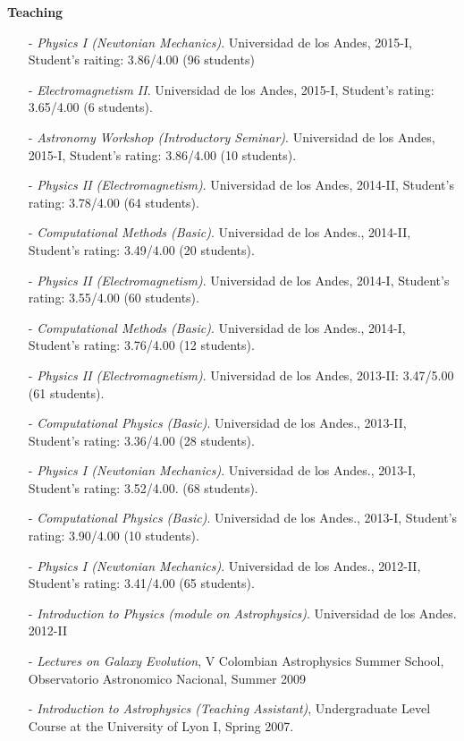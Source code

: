 \documentclass[letterpaper,11pt,onecolumn]{article}
\begin{document}
{\bf Teaching}
\begin{itemize}

\item[-] {\it Physics I (Newtonian Mechanics)}. Universidad de los
  Andes, 2015-I,  Student's raiting: 3.86/4.00 (96 students)
\item[-] {\it Electromagnetism II}. Universidad de los Andes, 2015-I,
  Student's rating: 3.65/4.00 (6 students).
\item[-] {\it Astronomy Workshop (Introductory Seminar)}. Universidad
  de los Andes, 2015-I, Student's rating: 3.86/4.00 (10 students).
\item[-] {\it Physics II (Electromagnetism)}. Universidad de
  los Andes, 2014-II, Student's rating: 3.78/4.00 (64 students).  
\item[-] {\it Computational Methods (Basic)}. Universidad de los
  Andes., 2014-II, Student's rating: 3.49/4.00 (20 students).
\item[-] {\it Physics II (Electromagnetism)}. Universidad de
  los Andes, 2014-I, Student's rating: 3.55/4.00 (60 students).  
\item[-] {\it Computational Methods (Basic)}. Universidad de los
  Andes., 2014-I, Student's rating: 3.76/4.00 (12 students).
\item[-] {\it Physics II (Electromagnetism)}. Universidad de
  los Andes, 2013-II: 3.47/5.00 (61 students).
\item[-] {\it Computational Physics (Basic)}. Universidad de los
  Andes., 2013-II, Student's rating: 3.36/4.00 (28 students).
\item[-] {\it Physics I (Newtonian Mechanics)}. Universidad
  de los Andes., 2013-I, Student's rating: 3.52/4.00. (68 students).
\item[-] {\it Computational Physics (Basic)}. Universidad de los
  Andes., 2013-I, Student's rating: 3.90/4.00 (10 students).
\item[-] {\it Physics I (Newtonian Mechanics)}. Universidad
  de los Andes., 2012-II, Student's rating: 3.41/4.00 (65 students).
\item[-] {\it Introduction to Physics (module on
  Astrophysics)}. Universidad de los Andes.  2012-II
\item[-]{\it Lectures on Galaxy Evolution}, V Colombian
  Astrophysics Summer School, Observatorio Astronomico Nacional, Summer 2009
\item[-]{\it{Introduction to Astrophysics (Teaching
      Assistant)}}, Undergraduate Level Course at the University of Lyon I,
      Spring 2007.
\end{itemize}
\end{document}
